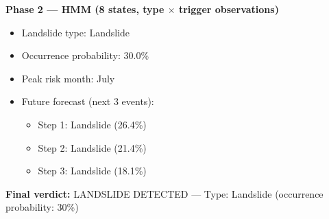 \documentclass[11pt]{article}
\begin{document}
\vspace{0.3cm}
\noindent \textbf{Phase 2 — HMM (8 states, type $\times$ trigger observations)}
\begin{itemize}[noitemsep]
    \item Landslide type: Landslide
    \item Occurrence probability: 30.0\%
    \item Peak risk month: July
    \item Future forecast (next 3 events):
    \begin{itemize}
        \item Step 1: Landslide (26.4\%)
        \item Step 2: Landslide (21.4\%)
        \item Step 3: Landslide (18.1\%)
    \end{itemize}
\end{itemize}

\noindent \textbf{Final verdict:} LANDSLIDE DETECTED — Type: Landslide (occurrence probability: 30\%)
\end{document}
